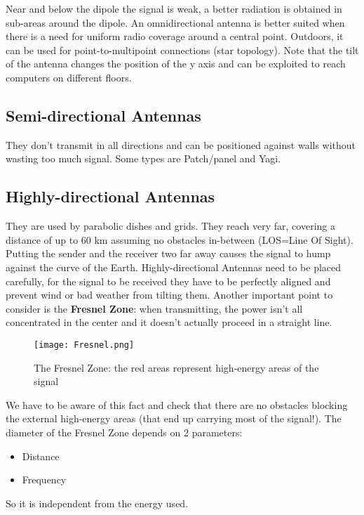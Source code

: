 Near and below the dipole the signal is weak, a better radiation is 
obtained in sub-areas around the dipole. An omnidirectional antenna is better 
suited when there is a need for uniform radio coverage around a central point. 
Outdoors, it can be used for point-to-multipoint connections (star topology). 
Note that the tilt of the antenna changes the position of the y axis and can be 
exploited to reach computers on different floors.

\subsection{Semi-directional Antennas} They don't transmit in all 
directions and can be positioned against walls without wasting too much signal. 
Some types are Patch/panel and Yagi.

\subsection{Highly-directional Antennas} They are used by parabolic 
dishes and grids. They reach very far, covering a distance of up to 60 km 
assuming no obstacles in-between (LOS=Line Of Sight). Putting the sender and the 
receiver two far away causes the signal to hump against the curve of the Earth. 
Highly-directional Antennas need to be placed carefully, for the signal to be 
received they have to be perfectly aligned and prevent wind or bad weather from 
tilting them.
Another important point to consider is the \textbf{Fresnel Zone}: when 
transmitting, the power isn't all concentrated in the center and it doesn't 
actually proceed in a straight line.

\begin{figure}[h]
  \centering
  \texttt{[image: Fresnel.png]}
  \caption[The Fresnel Zone]{The Fresnel Zone: the red areas represent
    high-energy areas of the signal}				
  \label{fig:ewn:Fresnel}
\end{figure}

We have to be aware of this fact and check that there are no obstacles 
blocking the external high-energy areas (that end up carrying most of the 
signal!).
The diameter of the Fresnel Zone depends on 2 parameters:
\begin{itemize}
\item Distance
\item Frequency
\end{itemize}
So it is independent from the energy used.

